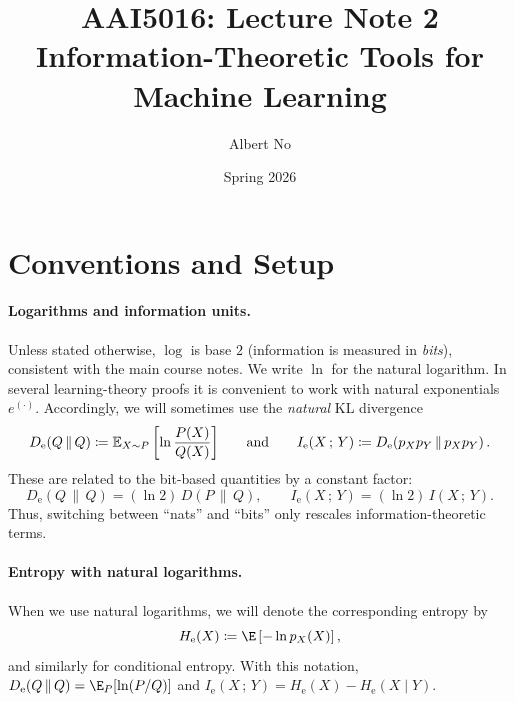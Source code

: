 \documentclass{article}
\title{AAI5016: Lecture Note 2\\Information-Theoretic Tools for Machine Learning}
\author{Albert No}
\date{Spring 2026}
\numberwithin{equation}{section}
\newcommand{\mathify}[1]{\ifmmode{#1}\else\mbox{$#1$}\fi}
\newcommand{\Esub}[2]{\mathify{\mathbb{E}_{#1}\left[#2\right]}}
\newcommand{\KL}[2]{D\!\left(#1\,\middle\|\,#2\right)}
\newcommand{\MI}[2]{I\!\left(#1\,;\,#2\right)}
\newcommand{\KLnat}[2]{D_{\mathrm{e}}\!\left(#2\,\middle\|\,#2\right)}
\newcommand{\MInat}[2]{I_{\mathrm{e}}\!\left(#1\,;\,#2\right)}
\begin{document}
\maketitle
\tableofcontents
\newpage

\section{Conventions and Setup}
\label{sec:ln2-setup}

\paragraph{Logarithms and information units.}
Unless stated otherwise, $\log$ is base $2$ (information is measured in \emph{bits}), consistent with the main course notes.
We write $\ln$ for the natural logarithm.
In several learning-theory proofs it is convenient to work with natural exponentials $e^{(\cdot)}$.
Accordingly, we will sometimes use the \emph{natural} KL divergence
\begin{equation}
    \KLnat{P}{Q} \coloneqq \Esub{X\sim P}{\ln\frac{P(X)}{Q(X)}}
    \qquad\text{and}\qquad
    \MInat{X}{Y} \coloneqq \KLnat{p_{X,Y}}{p_Xp_Y}.
\end{equation}
These are related to the bit-based quantities by a constant factor:
\begin{equation}
    \KLnat{P}{Q} = (\ln 2)\,\KL{P}{Q},
    \qquad
    \MInat{X}{Y} = (\ln 2)\,\MI{X}{Y}.
\end{equation}
Thus, switching between ``nats'' and ``bits'' only rescales information-theoretic terms.

\paragraph{Entropy with natural logarithms.}
When we use natural logarithms, we will denote the corresponding entropy by
\begin{equation}
    H_{\mathrm{e}}(X) \coloneqq \E\left[-\ln p_X(X)\right],
\end{equation}
and similarly for conditional entropy.
With this notation, $\KLnat{P}{Q}=\E_P[\ln(P/Q)]$ and
\(\MInat{X}{Y}=H_{\mathrm{e}}(X)-H_{\mathrm{e}}(X\mid Y)\).
\end{document}
